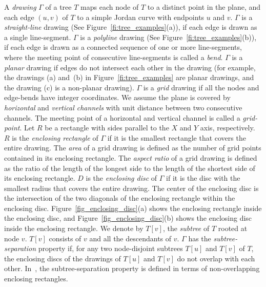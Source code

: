 \documentclass[]{article}
\begin{document}
{A {\em drawing} $\Gamma$ of a tree $T$
maps each node of $T$ to a distinct point in the plane, and each
edge $(u,v)$ of $T$ to a simple Jordan curve with endpoints $u$
and $v$. $\Gamma$ is a {\em straight-line} drawing (See
Figure~\ref{fi:tree_examples}(a)), if each edge is drawn as a single
line-segment. $\Gamma$ is a {\em polyline} drawing (See
Figure~\ref{fi:tree_examples}(b)), if each edge is drawn as a connected
sequence of one or more line-segments, where the meeting point of
consecutive line-segments is called a {\em bend}. 
$\Gamma$ is a {\em planar} drawing if edges do not
intersect each other in the drawing (for example, the drawings
(a) and~(b) in Figure~\ref{fi:tree_examples} are planar drawings,
and the drawing (c) is a non-planar drawing). 
$\Gamma$ is a {\em grid} drawing if  all the nodes
and edge-bends have integer coordinates. We assume the plane is
covered by {\em horizontal} and {\em vertical channels} with unit
distance between two consecutive channels. The meeting point of a
horizontal and vertical channel is called a {\em grid-point}. Let
$R$ be a rectangle with sides parallel to the $X$ and $Y$ axis,
respectively. $R$ is the  {\em enclosing rectangle} of $\Gamma$ if
it is the smallest rectangle that covers the entire drawing. The
{\em area} of a grid drawing is defined as the number of grid
points contained in its enclosing rectangle. The {\em aspect
ratio} of a grid drawing is defined as the ratio of the length of
the longest side to the length of the shortest side of its
enclosing rectangle.
$D$ is the {\em enclosing disc} of $\Gamma$ if it is the disc with the smallest radius that covers the entire drawing.
The center of the enclosing disc is the intersection of the two diagonals of the enclosing rectangle within the enclosing disc.
Figure~\ref{fig_enclosing_disc}(a) shows the enclosing rectangle inside the enclosing disc, and Figure~\ref{fig_enclosing_disc}(b) shows the enclosing disc inside the enclosing rectangle.
We denote by $T[v]$, the {\em subtree} of $T$
rooted at node $v$. $T[v]$ consists of $v$ and all the descendants
of $v$.
$\Gamma$ has the {\em subtree-separation}
property if, for any two node-disjoint subtrees
$T[u]$ and $T[v]$ of $T$, the enclosing discs of the drawings
of $T[u]$ and $T[v]$ do not overlap with each other.
In~\cite{cgkt-02}, the subtree-separation property is defined in terms of non-overlapping enclosing rectangles.

}
\end{document}
